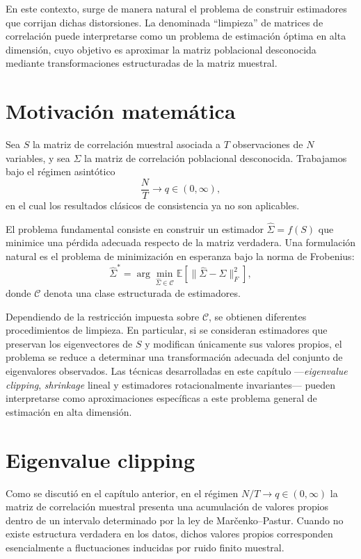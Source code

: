 \documentclass[letterpaper,12pt,oneside]{book}
\begin{document}
En este contexto, surge de manera natural el problema de construir estimadores que corrijan dichas distorsiones. La denominada ``limpieza'' de matrices de correlación puede interpretarse como un problema de estimación óptima en alta dimensión, cuyo objetivo es aproximar la matriz poblacional desconocida mediante transformaciones estructuradas de la matriz muestral.

\section*{Motivación matemática}

Sea $S$ la matriz de correlación muestral asociada a $T$ observaciones de $N$ variables, y sea $\Sigma$ la matriz de correlación poblacional desconocida. Trabajamos bajo el régimen asintótico
\[
\frac{N}{T} \longrightarrow q \in (0,\infty),
\]
en el cual los resultados clásicos de consistencia ya no son aplicables.

El problema fundamental consiste en construir un estimador $\widehat{\Sigma} = f(S)$ que minimice una pérdida adecuada respecto de la matriz verdadera. Una formulación natural es el problema de minimización en esperanza bajo la norma de Frobenius:
\[
\widehat{\Sigma}^{*}
=
\arg\min_{\widehat{\Sigma} \in \mathcal{C}}
\mathbb{E}
\left[
\|\widehat{\Sigma} - \Sigma\|_{F}^{2}
\right],
\]
donde $\mathcal{C}$ denota una clase estructurada de estimadores.

Dependiendo de la restricción impuesta sobre $\mathcal{C}$, se obtienen diferentes procedimientos de limpieza. En particular, si se consideran estimadores que preservan los eigenvectores de $S$ y modifican únicamente sus valores propios, el problema se reduce a determinar una transformación adecuada del conjunto de eigenvalores observados. Las técnicas desarrolladas en este capítulo —\textit{eigenvalue clipping}, \textit{shrinkage} lineal y estimadores rotacionalmente invariantes— pueden interpretarse como aproximaciones específicas a este problema general de estimación en alta dimensión.

\section{Eigenvalue clipping}

Como se discutió en el capítulo anterior, en el régimen $N/T \to q \in (0,\infty)$ la matriz de correlación muestral presenta una acumulación de valores propios dentro de un intervalo determinado por la ley de Marčenko–Pastur. Cuando no existe estructura verdadera en los datos, dichos valores propios corresponden esencialmente a fluctuaciones inducidas por ruido finito muestral.
\end{document}
